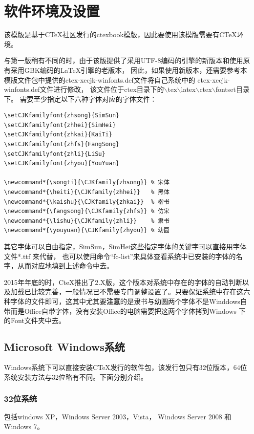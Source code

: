 \chapter{软件环境及设置}

该模版是基于CTeX社区发行的ctexbook模版，因此要使用该模版需要有CTeX环境。

与第一版稍有不同的时，由于该版提供了采用UTF-8编码的\XeTeX{}引擎的新版本和使用原有采用GBK编码的\LaTeX{}引擎的老版本，
因此，如果使用新版本，还需要参考本模版文件包中提供的ctex-xecjk-winfonts.def文件将自己系统中的
ctex-xecjk-winfonts.def文件进行修改，
该文件位于ctex目录下的$\backslash$tex$\backslash$latex$\backslash$ctex$\backslash$fontset目录下。
需要至少指定以下六种字体对应的字体文件：
\begin{verbatim}
\setCJKfamilyfont{zhsong}{SimSun}
\setCJKfamilyfont{zhhei}{SimHei}
\setCJKfamilyfont{zhkai}{KaiTi}
\setCJKfamilyfont{zhfs}{FangSong}
\setCJKfamilyfont{zhli}{LiSu}
\setCJKfamilyfont{zhyou}{YouYuan}

\newcommand*{\songti}{\CJKfamily{zhsong}} % 宋体
\newcommand*{\heiti}{\CJKfamily{zhhei}}   % 黑体
\newcommand*{\kaishu}{\CJKfamily{zhkai}}  % 楷书
\newcommand*{\fangsong}{\CJKfamily{zhfs}} % 仿宋
\newcommand*{\lishu}{\CJKfamily{zhli}}    % 隶书
\newcommand*{\youyuan}{\CJKfamily{zhyou}} % 幼圆
\end{verbatim}

其它字体可以自由指定，SimSun，SimHei这些指定字体的关键字可以直接用字体文件*.ttf 来代替，
也可以使用命令“fc-list”来具体查看系统中已安装的字体的名字，从而对应地填到上述命令中去。

2015年年底的时，CteX推出了2.X版，这个版本对系统中存在的字体的自动判断以及加载已比较完善，一般情况已不需要专门调整设置了。只要保证系统中存在这六种字体的文件即可，这其中尤其要{\bfseries 注意}的是隶书与幼圆两个字体不是Winddows自带而是Office自带字体，没有安装Office的电脑需要把这两个字体拷到Windows 下的Font文件夹中去。


\section{Microsoft Windows系统}

Windows系统下可以直接安装CTeX发行的软件包，该发行包只有32位版本，64位系统安装方法与32位略有不同。下面分别介绍。

\subsection{32位系统}

包括windows XP，Windows Server 2003，Vista， Windows Server 2008 和 Windows 7。

